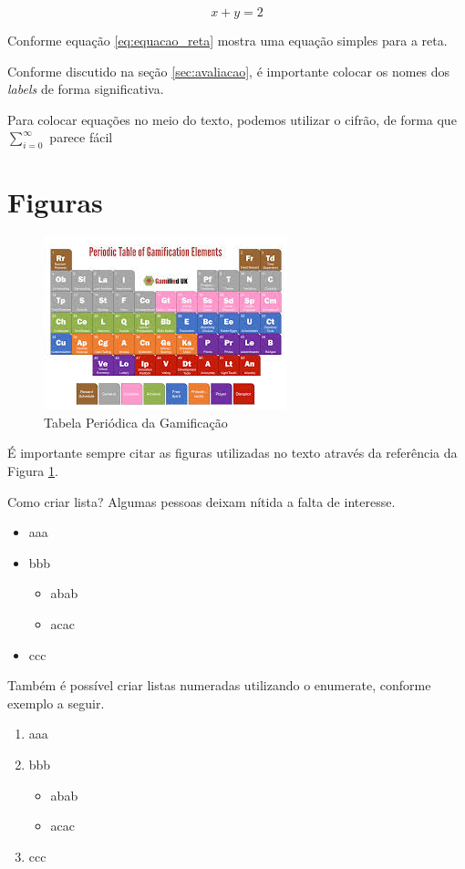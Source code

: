 \documentclass{article}
\begin{document}
    \begin{equation}\label{eq:equacao_reta}
        x + y = 2 
    \end{equation}


Conforme equação \ref{eq:equacao_reta} mostra uma equação simples para a reta.


Conforme discutido na seção \ref{sec:avaliacao}, é importante colocar os nomes dos \textit{labels} de forma significativa.


Para colocar equações no meio do texto, podemos utilizar o cifrão, de forma que $ \sum_{i=0}^\infty $ parece fácil

\section{Figuras}
    \begin{figure}[htb] %
        \centering
        \includegraphics[scale=0.5]{gamification}
        \caption{Tabela Periódica da Gamificação}
        \label{fig:tabela_periodica}
    \end{figure}
    
    É importante sempre citar as figuras utilizadas no texto através da referência da Figura \ref{fig:tabela_periodica}.
    
    
    Como criar lista? Algumas pessoas deixam nítida a falta de interesse.
    \begin{itemize}
        \item aaa
        \item bbb
        \begin{itemize}
            \item abab
            \item acac
        \end{itemize}
        \item ccc
    \end{itemize}
    
    Também é possível criar listas numeradas utilizando o enumerate, conforme exemplo a seguir.
    
    \begin{enumerate}
        \item aaa
        \item bbb
        \begin{itemize}
            \item abab
            \item acac
        \end{itemize}
        \item ccc
    \end{enumerate}
    
\end{document}
